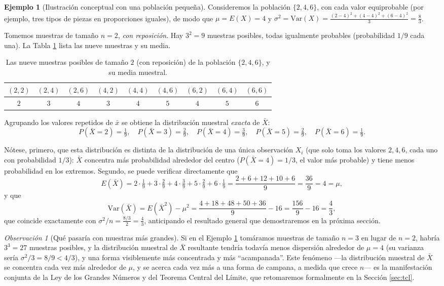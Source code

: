 \documentclass[11pt,a4paper]{article}
\theoremstyle{plain}
\theoremstyle{definition}
\newtheorem{ejemplo}[teorema]{Ejemplo}
\theoremstyle{remark}
\newtheorem{observacion}[teorema]{Observación}
\begin{document}
\begin{ejemplo}[Ilustración conceptual con una población pequeña]
\label{ej:poblacion-chica}
Consideremos la población $\{2,4,6\}$, con cada valor equiprobable (por ejemplo, tres tipos de piezas en proporciones iguales), de modo que $\mu = E(X) = 4$ y $\sigma^2 = \mathrm{Var}(X) = \frac{(2-4)^2+(4-4)^2+(6-4)^2}{3} = \frac{8}{3}$.

Tomemos muestras de tamaño $n=2$, \emph{con reposición}. Hay $3^2=9$ muestras posibles, todas igualmente probables (probabilidad $1/9$ cada una). La Tabla \ref{tab:muestras-chicas} lista las nueve muestras y su media.

\begin{table}[h]
\centering
\begin{tabular}{ccccccccc}
\toprule
$(2,2)$&$(2,4)$&$(2,6)$&$(4,2)$&$(4,4)$&$(4,6)$&$(6,2)$&$(6,4)$&$(6,6)$\\
\midrule
$2$&$3$&$4$&$3$&$4$&$5$&$4$&$5$&$6$\\
\bottomrule
\end{tabular}
\caption{Las nueve muestras posibles de tamaño $2$ (con reposición) de la población $\{2,4,6\}$, y su media muestral.}
\label{tab:muestras-chicas}
\end{table}

Agrupando los valores repetidos de $\bar x$ se obtiene la distribución muestral \emph{exacta} de $\bar X$:
$$P(\bar X=2)=\tfrac19,\quad P(\bar X=3)=\tfrac29,\quad P(\bar X=4)=\tfrac39,\quad P(\bar X=5)=\tfrac29,\quad P(\bar X=6)=\tfrac19.$$

Nótese, primero, que esta distribución es distinta de la distribución de una única observación $X_i$ (que solo toma los valores $2,4,6$, cada uno con probabilidad $1/3$): $\bar X$ concentra más probabilidad alrededor del centro ($P(\bar X = 4)=1/3$, el valor más probable) y tiene menos probabilidad en los extremos. Segundo, se puede verificar directamente que
$$E(\bar X) = 2\cdot\tfrac19+3\cdot\tfrac29+4\cdot\tfrac39+5\cdot\tfrac29+6\cdot\tfrac19 = \frac{2+6+12+10+6}{9}=\frac{36}{9}=4=\mu,$$
y que
$$\mathrm{Var}(\bar X) = E(\bar X^2)-\mu^2 = \frac{4+18+48+50+36}{9} - 16 = \frac{156}{9}-16 = \frac{4}{3},$$
que coincide exactamente con $\sigma^2/n = \frac{8/3}{2}=\frac{4}{3}$, anticipando el resultado general que demostraremos en la próxima sección.
\end{ejemplo}

\begin{observacion}[Qué pasaría con muestras más grandes]
Si en el Ejemplo \ref{ej:poblacion-chica} tomáramos muestras de tamaño $n=3$ en lugar de $n=2$, habría $3^3=27$ muestras posibles, y la distribución muestral de $\bar X$ resultante tendría todavía menos dispersión alrededor de $\mu=4$ (su varianza sería $\sigma^2/3 = 8/9 < 4/3$), y una forma visiblemente más concentrada y más ``acampanada''. Este fenómeno —la distribución muestral de $\bar X$ se concentra cada vez más alrededor de $\mu$, y se acerca cada vez más a una forma de campana, a medida que crece $n$— es la manifestación conjunta de la Ley de los Grandes Números y del Teorema Central del Límite, que retomaremos formalmente en la Sección \ref{sec:tcl}.
\end{observacion}
\end{document}
